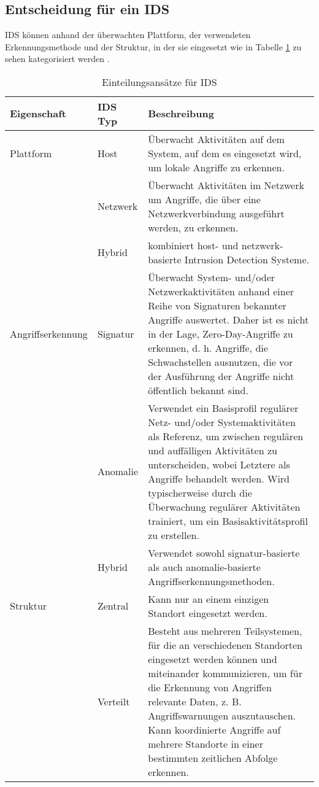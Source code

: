 \subsection{Entscheidung für ein IDS}
IDS können anhand der überwachten Plattform, der verwendeten Erkennungsmethode und der Struktur, in der sie eingesetzt wie in Tabelle \ref{Tabelle_1} zu sehen kategorisiert werden \cite{milenkoski_evaluating_2015}.
\begin{table}[H]
\label{Tabelle_1}
\caption{Einteilungsansätze für IDS}
\begin{tabularx}{\columnwidth}{p{3cm} l p{10cm}}
\toprule
Eigenschaft 
& IDS Typ 
& Beschreibung\\
\midrule
Plattform   
& Host     
& Überwacht Aktivitäten auf dem System, auf dem es eingesetzt wird, um lokale Angriffe zu erkennen.\\\addlinespace[0.5em]
& Netzwerk 
& Überwacht Aktivitäten im Netzwerk um Angriffe, die über eine Netzwerkverbindung ausgeführt werden, zu erkennen.\\ 
& Hybrid   
& kombiniert host- und netzwerk-basierte Intrusion Detection Systeme.\\
\midrule
Angriffserkennung 
& Signatur        
& Überwacht System- und/oder Netzwerkaktivitäten anhand einer Reihe von Signaturen bekannter Angriffe auswertet. Daher ist es nicht in der Lage, Zero-Day-Angriffe zu erkennen, d. h. Angriffe, die Schwachstellen ausnutzen, die vor der Ausführung der Angriffe nicht öffentlich bekannt sind.\\\addlinespace[0.5em]
& Anomalie        
& Verwendet ein Basisprofil regulärer Netz- und/oder Systemaktivitäten als Referenz, um zwischen regulären und auffälligen Aktivitäten zu unterscheiden, wobei Letztere als Angriffe behandelt werden. Wird typischerweise durch die Überwachung regulärer Aktivitäten trainiert, um ein Basisaktivitätsprofil zu erstellen.\\\addlinespace[0.5em]
& Hybrid          
& Verwendet sowohl signatur-basierte als auch anomalie-basierte Angriffserkennungsmethoden.\\ 
\midrule
Struktur
& Zentral
& Kann nur an einem einzigen Standort eingesetzt werden.\\\addlinespace[0.5em]
& Verteilt
& Besteht aus mehreren Teilsystemen, für die an verschiedenen Standorten eingesetzt werden können und miteinander kommunizieren, um für die Erkennung von Angriffen relevante Daten, z. B. Angriffswarnungen auszutauschen. Kann koordinierte Angriffe auf mehrere Standorte in einer bestimmten zeitlichen Abfolge erkennen.\\
\bottomrule
\end{tabularx}
\end{table}
